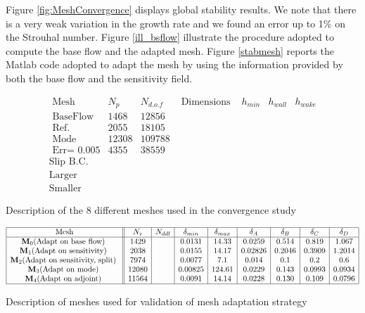 \documentclass[twocolumn,10pt]{asme2ej}
\begin{document}
Figure \ref{fig:MeshConvergence} displays global stability results. We note that there is 
a very weak variation in the growth rate and we found an error up to 1\% on the 
Strouhal number. Figure \ref{ill_bsflow} illustrate the procedure adopted to compute the 
base flow and the adapted mesh. Figure \ref{stabmesh} reports the Matlab code 
adopted to adapt the mesh by using the information provided by both the base flow and the sensitivity field. 


\begin{table}
$$
\begin{array}{c|c|c|c|c|c|c|}
\mbox{ Mesh } & N_p & N_{d.o.f} & \mbox{ Dimensions } & h_{min} & h_{wall} & h_{wake} \\ 
\mbox{ BaseFlow } & 1468 & 12856 \\
\mbox{ Ref.} & 2055 & 18105\\
\mbox{ Mode} &12308 & 109788 \\
\mbox{ Err= }0.005 & 4355 & 38559 \\
\mbox{Slip B.C.} & \\ 
\mbox{Larger} & \\
\mbox{Smaller} &  
\end{array}
$$
\caption{Description of the 8 different meshes used in the convergence study}
\end{table}




\begin{table*}
$$
\begin{array}{|c||c|c|c|c|c|c|c|c|c|}
\hline
\mbox{Mesh} & N_v & N_{ddl} & \delta_{min} & \delta_{max} & \delta_A  & \delta_B  & \delta_C  & \delta_D  \\
\hline
\mathbf{M}_0 \mbox{(Adapt on base flow) } & 1429 & 		& 0.0131 & 14.33 		& 0.0259 	& 0.514 	& 0.819 	& 1.067 \\   
\mathbf{M}_1 \mbox{(Adapt on sensitivity) } & 2038 & 		& 0.0155 & 14.17 		& 0.02826 & 0.2046 	& 0.3909 	& 1.2014 	\\
\mathbf{M}_2 \mbox{(Adapt on sensitivity, split) } & 7974 &		& 0.0077 & 7.1  		& 0.014 	& 0.1 	&   0.2 	& 0.6   \\
\mathbf{M}_3 \mbox{(Adapt on mode) } 	& 12080  &			&0.00825	& 124.61		& 0.0229	& 0.143	& 0.0993	& 0.0934 \\
\mathbf{M}_4 \mbox{(Adapt on adjoint) } 	& 11564 	&		& 0.0091	& 14.14		& 0.0228	& 0.130	& 0.109	& 0.0796  \\
\hline
\end{array}
$$
\caption{Description of meshes used for validation of mesh adaptation strategy}
\end{table*}
\end{document}
